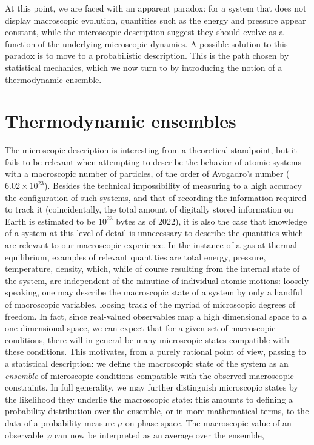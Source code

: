 At this point, we are faced with an apparent paradox: for a system that does not display macroscopic evolution, quantities such as the energy and pressure appear constant, while the microscopic description suggest they should evolve as a function of the underlying microscopic dynamics.
A possible solution to this paradox is to move to a probabilistic description. This is the path chosen by statistical mechanics, which we now turn to by introducing the notion of a thermodynamic ensemble.

\section{Thermodynamic ensembles}
The microscopic description is interesting from a theoretical standpoint, but it fails to be relevant when attempting to describe the behavior of atomic systems with a macroscopic number of particles, of the order of Avogadro's number ($6.02 \times 10^{23} $).
Besides the technical impossibility of measuring to a high accuracy the configuration of such systems, and that of recording the information required to track it (coincidentally, the total amount of digitally stored information on Earth is estimated to be $10^{23}$ bytes as of 2022), it is also the case that knowledge of a system at this level of detail is unnecessary to describe the quantities which are relevant to our macroscopic experience.
In the instance of a gas at thermal equilibrium, examples of relevant quantities are total energy, pressure, temperature, density, which, while of course resulting from the internal state of the system, are independent of the minutiae of individual atomic motions: loosely speaking, one may describe the macroscopic state of a system by only a handful of macroscopic variables, loosing track of the myriad of microscopic degrees of freedom.
In fact, since real-valued observables map a high dimensional space to a one dimensional space, we can expect that for a given set of macroscopic conditions, there will in general be many microscopic states compatible with these conditions.
This motivates, from a purely rational point of view, passing to a statistical description: we define the macroscopic state of the system as an \textit{ensemble} of microscopic conditions compatible with the observed macroscopic constraints.
In full generality, we may further distinguish microscopic states by the likelihood they underlie the macroscopic state: this amounts to defining a probability distribution over the ensemble, or in more mathematical terms, to the data of a probability measure $\mu$ on phase space.
The macroscopic value of an observable $\varphi$ can now be interpreted as an average over the ensemble,

